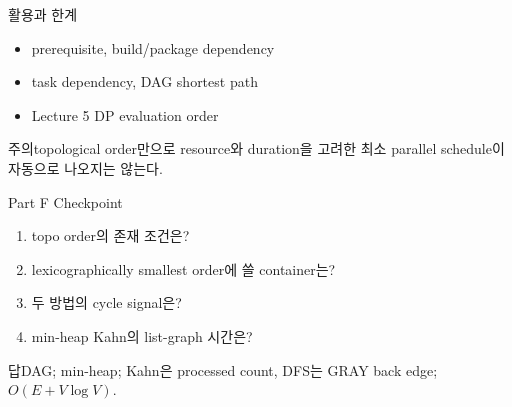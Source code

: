 \begin{frame}{활용과 한계}
\begin{itemize}\item prerequisite, build/package dependency\item task dependency, DAG shortest path\item Lecture 5 DP evaluation order\end{itemize}
\begin{alertblock}{주의}topological order만으로 resource와 duration을 고려한 최소 parallel schedule이 자동으로 나오지는 않는다.\end{alertblock}
\end{frame}
\begin{frame}{Part F Checkpoint}
\begin{enumerate}\item topo order의 존재 조건은?\item lexicographically smallest order에 쓸 container는?\item 두 방법의 cycle signal은?\item min-heap Kahn의 list-graph 시간은?\end{enumerate}
\begin{exampleblock}{답}DAG; min-heap; Kahn은 processed count, DFS는 GRAY back edge; \(O(E+V\log V)\).\end{exampleblock}
\end{frame}
